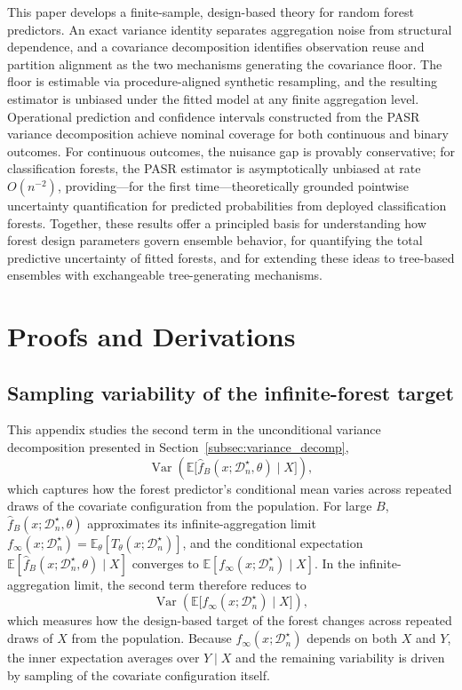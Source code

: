 \documentclass[11pt]{article}
\theoremstyle{plain}
\theoremstyle{definition}
\theoremstyle{remark}
\DeclareMathOperator{\Var}{Var}
\begin{document}
This paper develops a finite-sample, design-based theory for random forest predictors. An exact variance identity separates aggregation noise from structural dependence, and a covariance decomposition identifies observation reuse and partition alignment as the two mechanisms generating the covariance floor. The floor is estimable via procedure-aligned synthetic resampling, and the resulting estimator is unbiased under the fitted model at any finite aggregation level. Operational prediction and confidence intervals constructed from the PASR variance decomposition achieve nominal coverage for both continuous and binary outcomes. For continuous outcomes, the nuisance gap is provably conservative; for classification forests, the PASR estimator is asymptotically unbiased at rate $O(n^{-2})$, providing---for the first time---theoretically grounded pointwise uncertainty quantification for predicted probabilities from deployed classification forests. Together, these results offer a principled basis for understanding how forest design parameters govern ensemble behavior, for quantifying the total predictive uncertainty of fitted forests, and for extending these ideas to tree-based ensembles with exchangeable tree-generating mechanisms.
	

	
	
	
	\clearpage
	\appendix
\section{Proofs and Derivations}

\subsection{Sampling variability of the infinite-forest target}
\label{app:sampling_rate}

This appendix studies the second term in the unconditional variance decomposition presented in Section~\ref{subsec:variance_decomp},
\[
\Var\!\left(
\mathbb E\!\bigl[\hat f_B(x;\mathcal D_n^\star,\theta)\mid X\bigr]
\right),
\]
which captures how the forest predictor's conditional mean varies across repeated draws of the covariate configuration from the population. For large $B$, $\hat f_B(x;\mathcal D_n^\star,\theta)$ approximates its infinite-aggregation limit $f_\infty(x;\mathcal D_n^\star)=\mathbb E_\theta[T_\theta(x;\mathcal D_n^\star)]$, and the conditional expectation $\mathbb E[\hat f_B(x;\mathcal D_n^\star,\theta)\mid X]$ converges to $\mathbb E[f_\infty(x;\mathcal D_n^\star)\mid X]$. In the infinite-aggregation limit, the second term therefore reduces to
\[
\Var\!\left(
\mathbb E\!\bigl[f_\infty(x;\mathcal D_n^\star)\mid X\bigr]
\right),
\]
which measures how the design-based target of the forest changes across repeated draws of $X$ from the population. Because $f_\infty(x;\mathcal D_n^\star)$ depends on both $X$ and $Y$, the inner expectation averages over $Y\mid X$ and the remaining variability is driven by sampling of the covariate configuration itself.
\end{document}
